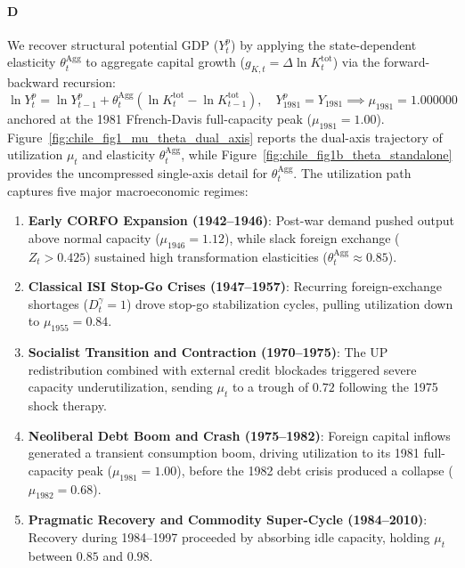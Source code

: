 \FloatBarrier

\paragraph{D} We recover structural potential GDP ($Y_t^p$) by applying the state-dependent elasticity $\theta_t^{\text{Agg}}$ to aggregate capital growth ($g_{K,t} = \Delta \ln K_t^{\text{tot}}$) via the forward-backward recursion:
\begin{equation}
	\ln Y_t^p = \ln Y_{t-1}^p + \theta_t^{\text{Agg}} \left( \ln K_t^{\text{tot}} - \ln K_{t-1}^{\text{tot}} \right), \quad Y_{1981}^p = Y_{1981} \implies \mu_{1981} = 1.000000
	\label{eq:chile_yp_recursion}
\end{equation}
anchored at the 1981 Ffrench-Davis full-capacity peak ($\mu_{1981} = 1.00$). Figure~\ref{fig:chile_fig1_mu_theta_dual_axis} reports the dual-axis trajectory of utilization $\mu_t$ and elasticity $\theta_t^{\text{Agg}}$, while Figure~\ref{fig:chile_fig1b_theta_standalone} provides the uncompressed single-axis detail for $\theta_t^{\text{Agg}}$. The utilization path captures five major macroeconomic regimes:
\begin{enumerate}
	\item \textbf{Early CORFO Expansion (1942--1946)}: Post-war demand pushed output above normal capacity ($\mu_{1946} = 1.12$), while slack foreign exchange ($Z_t > 0.425$) sustained high transformation elasticities ($\theta_t^{\text{Agg}} \approx 0.85$).
	\item \textbf{Classical ISI Stop-Go Crises (1947--1957)}: Recurring foreign-exchange shortages ($D_t^{\gamma} = 1$) drove stop-go stabilization cycles, pulling utilization down to $\mu_{1955} = 0.84$.
	\item \textbf{Socialist Transition and Contraction (1970--1975)}: The UP redistribution combined with external credit blockades triggered severe capacity underutilization, sending $\mu_t$ to a trough of $0.72$ following the 1975 shock therapy.
	\item \textbf{Neoliberal Debt Boom and Crash (1975--1982)}: Foreign capital inflows generated a transient consumption boom, driving utilization to its 1981 full-capacity peak ($\mu_{1981} = 1.00$), before the 1982 debt crisis produced a collapse ($\mu_{1982} = 0.68$).
	\item \textbf{Pragmatic Recovery and Commodity Super-Cycle (1984--2010)}: Recovery during 1984--1997 proceeded by absorbing idle capacity, holding $\mu_t$ between $0.85$ and $0.98$.
\end{enumerate}

